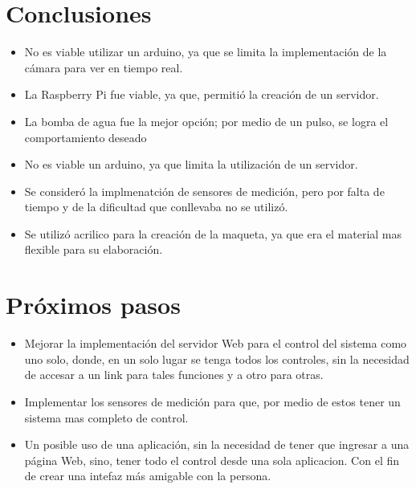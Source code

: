 \documentclass[12pt,letterpaper]{IEEEtran}
\begin{document}
\section{Conclusiones}
\begin{itemize}
	\item No es viable utilizar un arduino, ya que se limita la implementación de la cámara para ver en tiempo real.
	\item La Raspberry Pi fue viable, ya que, permitió la creación de un servidor.
	\item La bomba de agua fue la mejor opción; por medio de un pulso, se logra el comportamiento deseado
	\item No es viable un arduino, ya que limita la utilización de un servidor.
	\item Se consideró la implmenatción de sensores de medición, pero por falta de tiempo y de la dificultad que conllevaba no se utilizó.
	\item Se utilizó acrilico para la creación de la maqueta, ya que era el material mas flexible para su elaboración.
	
\end{itemize}
\section{Próximos pasos}

\begin{itemize}
	\item Mejorar la implementación del servidor Web para el control del sistema como uno solo, donde, en un solo lugar se tenga todos los controles, sin la necesidad de accesar a un link para tales funciones y a otro para otras.
	\item Implementar los sensores de medición para que, por medio de estos tener un sistema mas completo de control.
	\item Un posible uso de una aplicación, sin la necesidad de tener que ingresar a una página Web, sino, tener todo el control desde una sola aplicacion. Con el fin de crear una intefaz más amigable con la persona.
\end{itemize}
\end{document}
